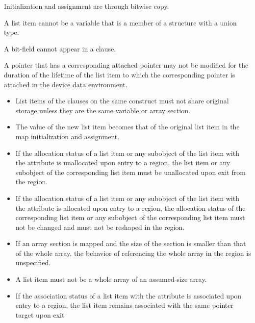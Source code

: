 \begin{itemize}
\begin{ccppspecific}
\item Initialization and assignment are through bitwise copy.
\item A list item cannot be a variable that is a member of a structure 
      with a union type.
\item A bit-field cannot appear in a  clause.
\item A pointer that has a corresponding attached pointer may not be modified
      for the duration of the lifetime of the list item to which the
      corresponding pointer is attached in the device data environment.
\end{ccppspecific}
\end{itemize}

\begin{fortranspecific}
\begin{itemize}
\item List items of the  clauses on the same construct must not share
      original storage unless they are the same variable or array section.
\item The value of the new list item becomes that of the original list item 
      in the map initialization and assignment.
\item If the allocation status of a list item or any subobject of the
      list item with the  attribute is unallocated upon
      entry to a  region, the list item or any subobject of
      the corresponding list item must be unallocated upon exit from the region.
\item If the allocation status of a list item or any subobject of the
      list item with the  attribute is allocated upon
      entry to a  region, the allocation status of the
      corresponding list item or any subobject of the corresponding list
     item must not be changed and must not be reshaped in the region.
\item If an array section is mapped and the size of the section is
      smaller than that of the whole array, the behavior of referencing
      the whole array in the  region is unspecified.
\item A list item must not be a whole array of an assumed-size array.
\item If the association status of a list item with the 
      attribute is associated upon entry to a  region, the
      list item remains associated with the same pointer target upon exit

\end{itemize}
\end{fortranspecific}
